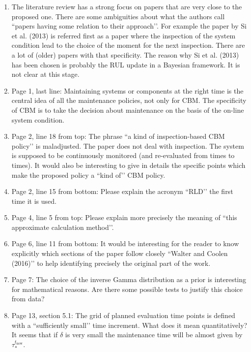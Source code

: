 \documentclass[authoryear]{elsarticle}
\def\tnow{t_\text{now}}
\begin{document}
\begin{enumerate}
\item The literature review has a strong focus on papers that are very close to the proposed one. There are some ambiguities about what the authors call ``papers having some relation to their approach’’. For example the paper by Si et al. (2013) is referred first as a paper where the inspection of the system condition lead to the choice of the moment for the next inspection. There are a lot of (older) papers with that specificity. The reason why Si et al. (2013) has been chosen is probably the RUL update in a Bayesian framework. It is not clear at this stage.

\item Page 1, last line: Maintaining systems or components at the right time is the central idea of all the maintenance policies, not only for CBM. The specificity of CBM is to take the decision about maintenance on the basis of the on-line system condition. 

\item Page 2, line 18 from top: The phrase ``a kind of inspection-based CBM policy’’ is maladjusted. The paper does not deal with inspection. The system is supposed to be continuously monitored (and re-evaluated from times to times). It would also be interesting to give in details the specific points which make the proposed policy a ``kind of’’ CBM policy.

\item Page 2, line 15 from bottom: Please explain the acronym ``RLD’’ the first time it is used. 

\item Page 4, line 5 from top: Please explain more precisely the meaning of ``this approximate calculation method’’.

\item Page 6, line 11 from bottom: It would be interesting for the reader to know explicitly which sections of the paper follow closely ``Walter and Coolen (2016)’’ to help identifying precisely the original part of the work. 

\item Page 7: The choice of the inverse Gamma distribution as a prior is interesting for mathematical reasons. Are there some possible tests to justify this choice from data?

\item Page 13, section 5.1: The grid of planned evaluation time points is defined with a ``sufficiently small’’ time increment. What does it mean quantitatively? It seems that if $\delta$ is very small the maintenance time will be almost given by $\tau_*^{\tnow}$.


\end{enumerate}
\end{document}
